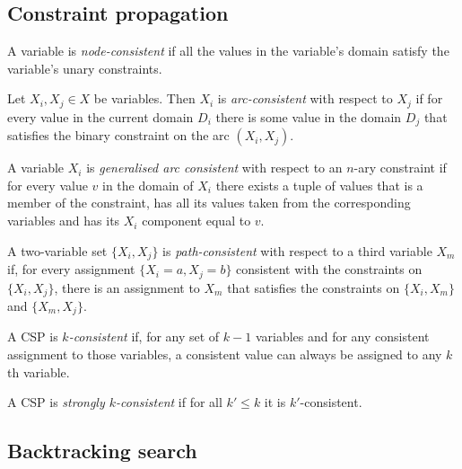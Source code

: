 \documentclass{article}
\begin{document}
\subsection{Constraint propagation}

\begin{definition}
    A variable is \emph{node-consistent} if all the values in the variable's
    domain satisfy the variable's unary constraints.
\end{definition}

\begin{definition}
    Let $X_i,X_j\in X$ be variables. Then $X_i$ is \emph{arc-consistent} with
    respect to $X_j$ if for every value in the current domain $D_i$ there is some
    value in the domain $D_j$ that satisfies the binary constraint on the arc
    $(X_i, X_j)$.
\end{definition}

\begin{definition}
    A variable $X_i$ is \emph{generalised arc consistent} with respect to
    an $n$-ary constraint if for every value $v$ in the domain of $X_i$ there
    exists a tuple of values that is a member of the constraint, has all its values
    taken from the corresponding variables and has its $X_i$ component equal to $v$.
\end{definition}

\begin{definition}
    A two-variable set $\{X_i, X_j\}$ is \emph{path-consistent} with respect to a
    third variable $X_m$ if, for every assignment $\{X_i=a,X_j=b\}$ consistent with
    the constraints on $\{X_i,X_j\}$, there is an assignment to $X_m$ that satisfies
    the constraints on $\{X_i,X_m\}$ and $\{X_m,X_j\}$.
\end{definition}

\begin{definition}
    A CSP is \emph{$k$-consistent} if, for any set of $k-1$ variables and for any consistent 
    assignment to those variables, a consistent value can always be assigned to any
    $k$th variable.
\end{definition}

\begin{definition}
    A CSP is \emph{strongly $k$-consistent} if for all $k'\leq k$ it is $k'$-consistent.
\end{definition}

\subsection{Backtracking search}
\end{document}
